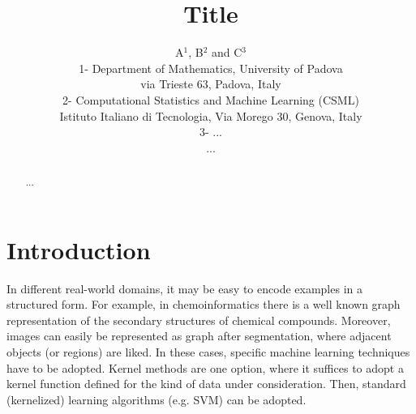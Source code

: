 \documentclass{esannV2}
\newcommand{\1}{{\bf 1}}
\begin{document}
\title{Title}

\author{A$^1$, B$^2$ and C$^3$
%
%
\vspace{.3cm}\\
%
1- Department of Mathematics, University of Padova\\
via Trieste 63, Padova, Italy
\vspace{.1cm}\\
2- Computational Statistics and Machine Learning (CSML) \\
Istituto Italiano di Tecnologia, Via Morego 30, Genova, Italy
\vspace{.1cm}\\
3- ... \\
...
}

%

\maketitle


\begin{abstract}
...
\end{abstract}


\section{Introduction}
In different real-world domains, it may be easy to encode examples in a structured form. For example, in chemoinformatics there is a well known graph representation of the secondary structures of chemical compounds. Moreover, images can easily be represented as graph after segmentation, where adjacent objects (or regions) are liked.
In these cases, specific machine learning techniques have to be adopted.
Kernel methods are one option, where it suffices to adopt a kernel function defined for the kind of data under consideration. Then, standard (kernelized) learning algorithms (e.g. SVM) can be adopted.
\end{document}
